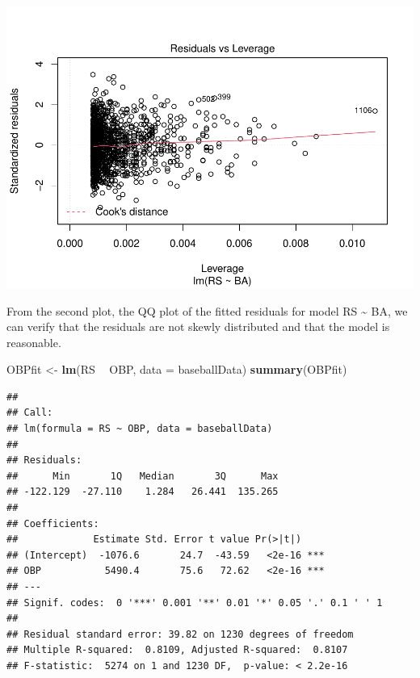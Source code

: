 \documentclass[
]{article}
\newenvironment{Shaded}{\begin{snugshade}}{\end{snugshade}}
\newcommand{\DataTypeTok}[1]{\textcolor[rgb]{0.13,0.29,0.53}{#1}}
\newcommand{\KeywordTok}[1]{\textcolor[rgb]{0.13,0.29,0.53}{\textbf{#1}}}
\newcommand{\NormalTok}[1]{#1}
\newcommand{\OperatorTok}[1]{\textcolor[rgb]{0.81,0.36,0.00}{\textbf{#1}}}
\newcommand{\StringTok}[1]{\textcolor[rgb]{0.31,0.60,0.02}{#1}}
\begin{document}
\includegraphics{HW2_Liu-Zi-Jian_files/figure-latex/unnamed-chunk-34-4.pdf}

From the second plot, the QQ plot of the fitted residuals for model RS
\textasciitilde{} BA, we can verify that the residuals are not skewly
distributed and that the model is reasonable.

\begin{Shaded}
\begin{Highlighting}[]
\NormalTok{OBPfit <-}\StringTok{ }\KeywordTok{lm}\NormalTok{(RS }\OperatorTok{~}\StringTok{ }\NormalTok{OBP, }\DataTypeTok{data =}\NormalTok{ baseballData)}
\KeywordTok{summary}\NormalTok{(OBPfit)}
\end{Highlighting}
\end{Shaded}

\begin{verbatim}
## 
## Call:
## lm(formula = RS ~ OBP, data = baseballData)
## 
## Residuals:
##      Min       1Q   Median       3Q      Max 
## -122.129  -27.110    1.284   26.441  135.265 
## 
## Coefficients:
##             Estimate Std. Error t value Pr(>|t|)    
## (Intercept)  -1076.6       24.7  -43.59   <2e-16 ***
## OBP           5490.4       75.6   72.62   <2e-16 ***
## ---
## Signif. codes:  0 '***' 0.001 '**' 0.01 '*' 0.05 '.' 0.1 ' ' 1
## 
## Residual standard error: 39.82 on 1230 degrees of freedom
## Multiple R-squared:  0.8109, Adjusted R-squared:  0.8107 
## F-statistic:  5274 on 1 and 1230 DF,  p-value: < 2.2e-16
\end{verbatim}

\begin{Shaded}
\end{Shaded}
\end{document}
